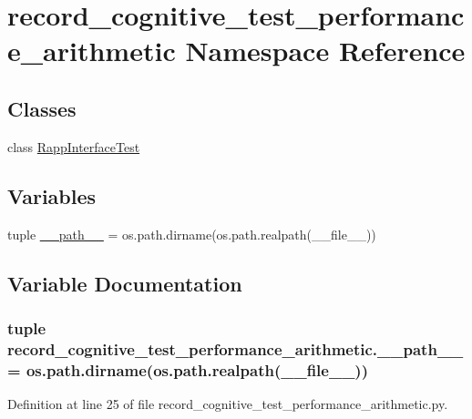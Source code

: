 \hypertarget{namespacerecord__cognitive__test__performance__arithmetic}{\section{record\-\_\-cognitive\-\_\-test\-\_\-performance\-\_\-arithmetic Namespace Reference}
\label{namespacerecord__cognitive__test__performance__arithmetic}
}
\subsection*{Classes}
\begin{DoxyCompactItemize}
\item 
class \hyperlink{classrecord__cognitive__test__performance__arithmetic_1_1RappInterfaceTest}{Rapp\-Interface\-Test}
\end{DoxyCompactItemize}
\subsection*{Variables}
\begin{DoxyCompactItemize}
\item 
tuple \hyperlink{namespacerecord__cognitive__test__performance__arithmetic_ab0f1fab3dc83be5fe335a26a16a95daf}{\-\_\-\-\_\-path\-\_\-\-\_\-} = os.\-path.\-dirname(os.\-path.\-realpath(\-\_\-\-\_\-file\-\_\-\-\_\-))
\end{DoxyCompactItemize}


\subsection{Variable Documentation}
\hypertarget{namespacerecord__cognitive__test__performance__arithmetic_ab0f1fab3dc83be5fe335a26a16a95daf}{
\subsubsection[{\-\_\-\-\_\-path\-\_\-\-\_\-}]{\setlength{\rightskip}{0pt plus 5cm}tuple record\-\_\-cognitive\-\_\-test\-\_\-performance\-\_\-arithmetic.\-\_\-\-\_\-path\-\_\-\-\_\- = os.\-path.\-dirname(os.\-path.\-realpath(\-\_\-\-\_\-file\-\_\-\-\_\-))}}\label{namespacerecord__cognitive__test__performance__arithmetic_ab0f1fab3dc83be5fe335a26a16a95daf}


Definition at line 25 of file record\-\_\-cognitive\-\_\-test\-\_\-performance\-\_\-arithmetic.\-py.

